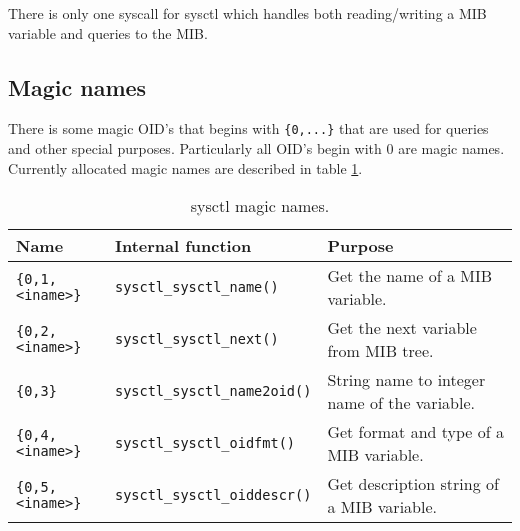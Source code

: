 There is only one syscall for sysctl which handles both reading/writing a
\ac{MIB} variable and queries to the MIB.

\subsection{Magic names}

There is some magic OID's that begins with \verb+{0,...}+ that are used for
queries and other special purposes. Particularly all OID's begin with 0 are
magic names. Currently allocated magic names are described in table
\ref{table:sysctlmagic}.

\begin{table}
\caption{sysctl magic names.}
\label{table:sysctlmagic}
\begin{tabular}{lll}
Name                & Internal function        & Purpose\\
\hline
\verb+{0,1,<iname>}+ & \verb+sysctl_sysctl_name()+     & Get the name of a MIB variable.\\
\verb+{0,2,<iname>}+ & \verb+sysctl_sysctl_next()+     & Get the next variable from MIB tree.\\
\verb+{0,3}+            & \verb+sysctl_sysctl_name2oid()+ & String name to integer name of the variable.\\
\verb+{0,4,<iname>}+ & \verb+sysctl_sysctl_oidfmt()+   & Get format and type of a MIB variable.\\
\verb+{0,5,<iname>}+ & \verb+sysctl_sysctl_oiddescr()+ & Get description string of a MIB variable.
\end{tabular}
\end{table}
